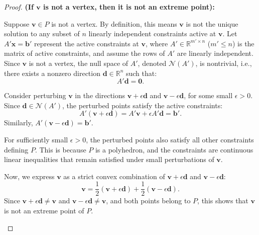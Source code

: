 \begin{proof}
\textbf{(If \( \mathbf{v} \) is not a vertex, then it is not an extreme point):}

Suppose \( \mathbf{v} \in P \) is not a vertex. By definition, this means \( \mathbf{v} \) is not the unique solution to any subset of \( n \) linearly independent constraints active at \( \mathbf{v} \). Let \( A' \mathbf{x} = \mathbf{b}' \) represent the active constraints at \( \mathbf{v} \), where \( A' \in \mathbb{R}^{m' \times n} \) (\( m' \leq n \)) is the matrix of active constraints, and assume the rows of \( A' \) are linearly independent. Since \( \mathbf{v} \) is not a vertex, the null space of \( A' \), denoted \( \mathcal{N}(A') \), is nontrivial, i.e., there exists a nonzero direction \( \mathbf{d} \in \mathbb{R}^n \) such that:
\[
A' \mathbf{d} = \mathbf{0}.
\]

Consider perturbing \( \mathbf{v} \) in the directions \( \mathbf{v} + \epsilon \mathbf{d} \) and \( \mathbf{v} - \epsilon \mathbf{d} \), for some small \( \epsilon > 0 \). Since \( \mathbf{d} \in \mathcal{N}(A') \), the perturbed points satisfy the active constraints:
\[
A' (\mathbf{v} + \epsilon \mathbf{d}) = A' \mathbf{v} + \epsilon A' \mathbf{d} = \mathbf{b}'.
\]
Similarly, \( A' (\mathbf{v} - \epsilon \mathbf{d}) = \mathbf{b}' \).

For sufficiently small \( \epsilon > 0 \), the perturbed points also satisfy all other constraints defining \( P \). This is because \( P \) is a polyhedron, and the constraints are continuous linear inequalities that remain satisfied under small perturbations of \( \mathbf{v} \).

Now, we express \( \mathbf{v} \) as a strict convex combination of \( \mathbf{v} + \epsilon \mathbf{d} \) and \( \mathbf{v} - \epsilon \mathbf{d} \):
\[
\mathbf{v} = \frac{1}{2} (\mathbf{v} + \epsilon \mathbf{d}) + \frac{1}{2} (\mathbf{v} - \epsilon \mathbf{d}).
\]
Since \( \mathbf{v} + \epsilon \mathbf{d} \neq \mathbf{v} \) and \( \mathbf{v} - \epsilon \mathbf{d} \neq \mathbf{v} \), and both points belong to \( P \), this shows that \( \mathbf{v} \) is not an extreme point of \( P \).

\begin{center}
\end{center}
\end{proof}
